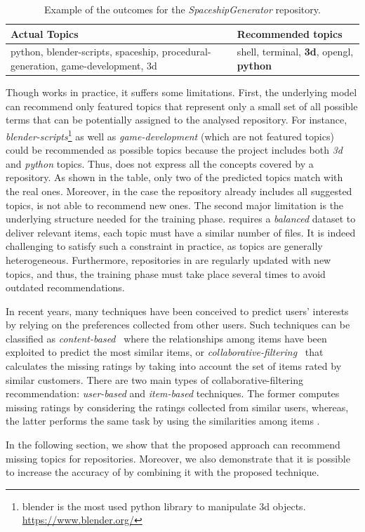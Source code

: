 \begin{table}[h]
\centering
\caption{Example of the \MNB outcomes for the \emph{SpaceshipGenerator} repository.}
\resizebox{8.5cm}{!} {
\footnotesize
\begin{tabular}{| p{3.2cm} | p{3.2cm} | }
\hline
 \textbf{Actual Topics} &\textbf{ Recommended topics} \\ \hline
     python, blender-scripts, spaceship, procedural-generation, 
     game-development, 3d        &  
  shell, terminal, \textbf{3d},    opengl,    \textbf{python}        \\ \hline

\end{tabular}
}
\label{tab:example}
\end{table} 


Though \MNB works in practice, it suffers some limitations. First, the 
underlying model can recommend only featured topics that represent only a small 
set of all possible terms that can be potentially assigned to the analysed 
repository.
%
For instance, \emph{blender-scripts}\footnote{blender is the most used python 
library to manipulate 3d objects. \url{https://www.blender.org/}} as well as 
\emph{game-development} (which are not featured topics) could be recommended as 
possible topics because the project includes both \emph{3d} and \emph{python} 
topics. Thus, \MNB does not express all the concepts covered by a \GH 
repository. As shown in the table, only two of the predicted topics match 
with the real ones. Moreover, in the case the repository already includes all 
suggested topics, \MNB is not able to recommend new ones.
The second major limitation is the underlying structure needed for the training 
phase. \MNB requires a \emph{balanced} dataset to deliver relevant items, 
\ie each topic must have a similar number of \RM files. It is indeed challenging to satisfy such a constraint in practice, as topics are generally heterogeneous. 
Furthermore, repositories in \GH are regularly updated with new topics, and 
thus, the training phase must take place several times to avoid outdated 
recommendations. 

In recent years, many techniques have been conceived to predict users' interests 
by relying on the preferences collected from other users. Such techniques can 
be classified as  \emph{content-based}~\cite{Pazzani2007} where the 
relationships among items have been exploited to predict the most similar items,
or \emph{collaborative-filtering}~\cite{Miranda:2008:ICF:1486927.1487083} that 
calculates the missing ratings by taking into account the set of items rated by 
similar customers. There are two main types of collaborative-filtering 
recommendation: \emph{user-based} \cite{Zhao:2010:UCR:1748610.1749278} and 
\emph{item-based} \cite{Sarwar:2001:ICF:371920.372071} techniques. The former 
computes missing ratings by considering the ratings collected from similar 
users, whereas, the latter performs the same task by using the similarities 
among items \cite{Cremonesi:2008:EMC:1468165.1468327}.

In the following section, we show that the proposed %
approach can recommend missing topics for \GH repositories. Moreover, we also 
demonstrate that it is possible to increase the accuracy of \MNB by combining 
it with the proposed technique.

